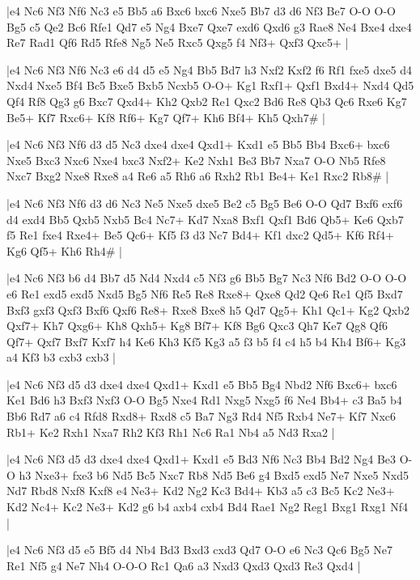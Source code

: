 \whitename{}
\blackname{}
\makegametitle
|e4 Nc6 Nf3 Nf6 Nc3 e5 Bb5 a6 Bxc6 bxc6 Nxe5 Bb7 d3 d6 Nf3 Be7 O-O O-O Bg5 c5 Qe2 Bc6 Rfe1 Qd7 e5 Ng4 Bxe7 Qxe7 exd6 Qxd6 g3 Rae8 Ne4 Bxe4 dxe4 Re7 Rad1 Qf6 Rd5 Rfe8 Ng5 Ne5 Rxc5 Qxg5 f4 Nf3+ Qxf3 Qxc5+  |

\whitename{}
\blackname{}
\makegametitle
|e4 Nc6 Nf3 Nf6 Nc3 e6 d4 d5 e5 Ng4 Bb5 Bd7 h3 Nxf2 Kxf2 f6 Rf1 fxe5 dxe5 d4 Nxd4 Nxe5 Bf4 Bc5 Bxe5 Bxb5 Ncxb5 O-O+ Kg1 Rxf1+ Qxf1 Bxd4+ Nxd4 Qd5 Qf4 Rf8 Qg3 g6 Bxc7 Qxd4+ Kh2 Qxb2 Re1 Qxc2 Bd6 Re8 Qb3 Qc6 Rxe6 Kg7 Be5+ Kf7 Rxc6+ Kf8 Rf6+ Kg7 Qf7+ Kh6 Bf4+ Kh5 Qxh7\#  |

\whitename{}
\blackname{}
\makegametitle
|e4 Nc6 Nf3 Nf6 d3 d5 Nc3 dxe4 dxe4 Qxd1+ Kxd1 e5 Bb5 Bb4 Bxc6+ bxc6 Nxe5 Bxc3 Nxc6 Nxe4 bxc3 Nxf2+ Ke2 Nxh1 Be3 Bb7 Nxa7 O-O Nb5 Rfe8 Nxc7 Bxg2 Nxe8 Rxe8 a4 Re6 a5 Rh6 a6 Rxh2 Rb1 Be4+ Ke1 Rxc2 Rb8\#  |

\whitename{}
\blackname{}
\makegametitle
|e4 Nc6 Nf3 Nf6 d3 d6 Nc3 Ne5 Nxe5 dxe5 Be2 c5 Bg5 Be6 O-O Qd7 Bxf6 exf6 d4 exd4 Bb5 Qxb5 Nxb5 Bc4 Nc7+ Kd7 Nxa8 Bxf1 Qxf1 Bd6 Qb5+ Ke6 Qxb7 f5 Re1 fxe4 Rxe4+ Be5 Qc6+ Kf5 f3 d3 Nc7 Bd4+ Kf1 dxc2 Qd5+ Kf6 Rf4+ Kg6 Qf5+ Kh6 Rh4\#  |

\whitename{}
\blackname{}
\makegametitle
|e4 Nc6 Nf3 b6 d4 Bb7 d5 Nd4 Nxd4 c5 Nf3 g6 Bb5 Bg7 Nc3 Nf6 Bd2 O-O O-O e6 Re1 exd5 exd5 Nxd5 Bg5 Nf6 Re5 Re8 Rxe8+ Qxe8 Qd2 Qe6 Re1 Qf5 Bxd7 Bxf3 gxf3 Qxf3 Bxf6 Qxf6 Re8+ Rxe8 Bxe8 h5 Qd7 Qg5+ Kh1 Qc1+ Kg2 Qxb2 Qxf7+ Kh7 Qxg6+ Kh8 Qxh5+ Kg8 Bf7+ Kf8 Bg6 Qxc3 Qh7 Ke7 Qg8 Qf6 Qf7+ Qxf7 Bxf7 Kxf7 h4 Ke6 Kh3 Kf5 Kg3 a5 f3 b5 f4 c4 h5 b4 Kh4 Bf6+ Kg3 a4 Kf3 b3 cxb3 cxb3  |

\whitename{}
\blackname{}
\makegametitle
|e4 Nc6 Nf3 d5 d3 dxe4 dxe4 Qxd1+ Kxd1 e5 Bb5 Bg4 Nbd2 Nf6 Bxc6+ bxc6 Ke1 Bd6 h3 Bxf3 Nxf3 O-O Bg5 Nxe4 Rd1 Nxg5 Nxg5 f6 Ne4 Bb4+ c3 Ba5 b4 Bb6 Rd7 a6 c4 Rfd8 Rxd8+ Rxd8 c5 Ba7 Ng3 Rd4 Nf5 Rxb4 Ne7+ Kf7 Nxc6 Rb1+ Ke2 Rxh1 Nxa7 Rh2 Kf3 Rh1 Nc6 Ra1 Nb4 a5 Nd3 Rxa2  |

\whitename{}
\blackname{}
\makegametitle
|e4 Nc6 Nf3 d5 d3 dxe4 dxe4 Qxd1+ Kxd1 e5 Bd3 Nf6 Nc3 Bb4 Bd2 Ng4 Be3 O-O h3 Nxe3+ fxe3 b6 Nd5 Bc5 Nxc7 Rb8 Nd5 Be6 g4 Bxd5 exd5 Ne7 Nxe5 Nxd5 Nd7 Rbd8 Nxf8 Kxf8 e4 Ne3+ Kd2 Ng2 Kc3 Bd4+ Kb3 a5 c3 Bc5 Kc2 Ne3+ Kd2 Nc4+ Kc2 Ne3+ Kd2 g6 b4 axb4 cxb4 Bd4 Rae1 Ng2 Reg1 Bxg1 Rxg1 Nf4  |

\whitename{}
\blackname{}
\makegametitle
|e4 Nc6 Nf3 d5 e5 Bf5 d4 Nb4 Bd3 Bxd3 cxd3 Qd7 O-O e6 Nc3 Qc6 Bg5 Ne7 Re1 Nf5 g4 Ne7 Nh4 O-O-O Rc1 Qa6 a3 Nxd3 Qxd3 Qxd3 Re3 Qxd4  |

